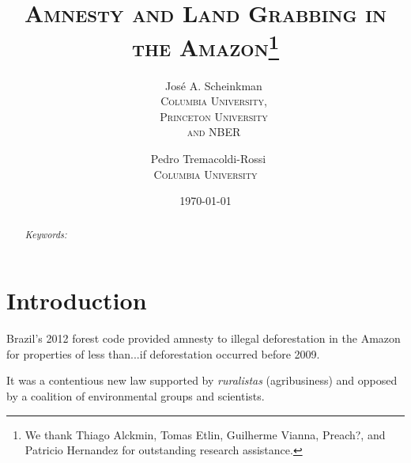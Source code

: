 \documentclass[12pt]{article}
\date{\today}
\newcommand{\PTR}[1]{{\color{blue}{#1}}}
\begin{document}
	\title{\LARGE \textsc{Amnesty and Land Grabbing in the Amazon}\thanks{We thank Thiago Alckmin, Tomas Etlin, Guilherme Vianna, Preach?, and Patricio Hernandez for outstanding research assistance.}}
	
	
	\author{ \ \ \ Jos{\'e} A. Scheinkman \\  \vspace{-0.5cm}  \small{ \ \ \  \textsc{Columbia University,}} \\ \vspace{-0.5cm} \small{ \ \ \  \textsc{Princeton University}} \\  \small{ \ \ \  \textsc{and NBER}} \and \  Pedro Tremacoldi-Rossi \\ \small{\textsc{Columbia University}}}
	\maketitle
	\begin{abstract}
		\singlespacing
		\noindent 
		\PTR{This paper.}

 	\noindent \medskip{}
		
		
		\noindent \emph{Keywords:  }
		
	\end{abstract}
	\setcounter{page}{0}
\thispagestyle{empty}
	\noindent 

\clearpage

\section{Introduction}



 

Brazil's 2012 forest code provided amnesty to illegal deforestation in the Amazon for  properties of less than...if deforestation occurred  before 2009. 

It was a contentious new law supported by \textit{ruralistas} (agribusiness) and opposed by a coalition of environmental groups and scientists.
\end{document}
